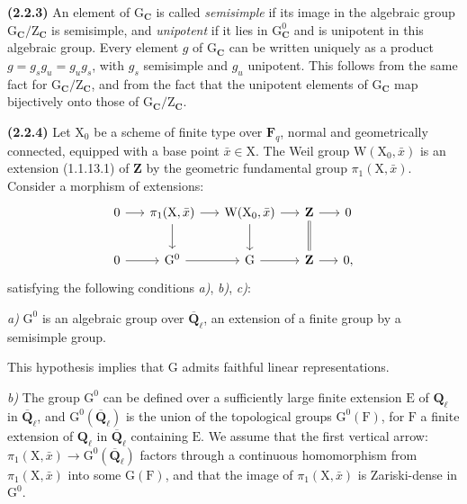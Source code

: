 \documentclass[11pt,leqno]{article}
\begin{document}
\textbf{(2.2.3)} An element of \(\mathrm G_{\mathbf C}\) is called \textit{semisimple} if its image in the algebraic group \(\mathrm G_{\mathbf C}/\mathrm Z_{\mathbf C}\) is semisimple, and \textit{unipotent} if it lies in \(\mathrm G_{\mathbf C}^0\) and is unipotent in this algebraic group. Every element \(g\) of \(\mathrm G_{\mathbf C}\) can be written uniquely as a product \(g=g_sg_u=g_ug_s\), with \(g_s\) semisimple and \(g_u\) unipotent. This follows from the same fact for \(\mathrm G_{\mathbf C}/\mathrm Z_{\mathbf C}\), and from the fact that the unipotent elements of \(\mathrm G_{\mathbf C}\) map bijectively onto those of \(\mathrm G_{\mathbf C}/\mathrm Z_{\mathbf C}\).

\textbf{(2.2.4)} Let \(\mathrm X_0\) be a scheme of finite type over \(\mathbf F_q\), normal and geometrically connected, equipped with a base point \(\bar{x}\in\mathrm X\). The Weil group \(\mathrm W(\mathrm X_0,\bar{x})\) is an extension (1.1.13.1) of \(\mathbf Z\) by the geometric fundamental group \(\pi_1(\mathrm X,\bar{x})\). Consider a morphism of extensions:
\[
\begin{tikzcd}[ampersand replacement=\&, column sep=1.5em, row sep=2em]
0 \arrow[r] \&
\pi_1(\mathrm X,\bar{x}) \arrow[r] \arrow[d] \&
\mathrm W(\mathrm X_0,\bar{x}) \arrow[r] \arrow[d] \&
\mathbf Z \arrow[r] \arrow[d,equal] \& 0 \\
0 \arrow[r] \&
\mathrm G^0 \arrow[r] \&
\mathrm G \arrow[r] \&
\mathbf Z \arrow[r] \& 0,
\end{tikzcd}
\]
satisfying the following conditions \textit{a)}, \textit{b)}, \textit{c)}:

\textit{a)} \(\mathrm G^0\) is an algebraic group over \(\overline{\mathbf Q}_\ell\), an extension of a finite group by a semisimple group.

This hypothesis implies that \(\mathrm G\) admits faithful linear representations.

\textit{b)} The group \(\mathrm G^0\) can be defined over a sufficiently large finite extension \(\mathrm E\) of \(\mathbf Q_\ell\) in \(\overline{\mathbf Q}_\ell\), and \(\mathrm G^0(\overline{\mathbf Q}_\ell)\) is the union of the topological groups \(\mathrm G^0(\mathrm F)\), for \(\mathrm F\) a finite extension of \(\mathbf Q_\ell\) in \(\overline{\mathbf Q}_\ell\) containing \(\mathrm E\). We assume that the first vertical arrow: \(\pi_1(\mathrm X,\bar{x})\to\mathrm G^0(\overline{\mathbf Q}_\ell)\) factors through a continuous homomorphism from \(\pi_1(\mathrm X,\bar{x})\) into some \(\mathrm G(\mathrm F)\), and that the image of \(\pi_1(\mathrm X,\bar{x})\) is Zariski-dense in \(\mathrm G^0\).
\end{document}
